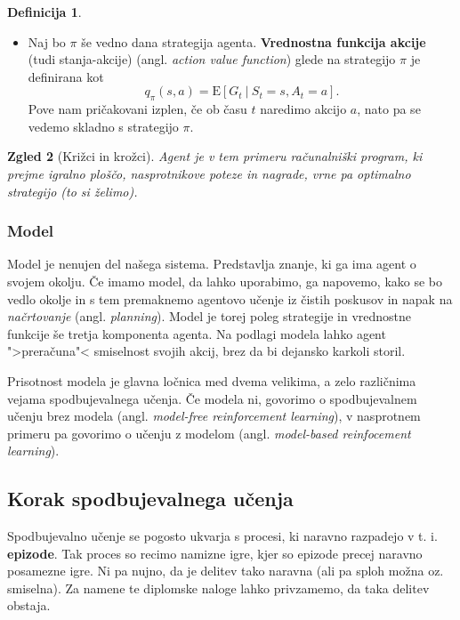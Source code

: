 \documentclass[12pt,a4paper]{amsart}
\theoremstyle{definition} %
\newtheorem{definicija}{Definicija}[section]
\theoremstyle{plain} %
\newtheorem{zgled}[definicija]{Zgled}
\begin{document}
\begin{definicija}
\begin{itemize}
        \item Naj bo $\pi$ še vedno dana strategija agenta. \textbf{Vrednostna funkcija 
                akcije} (tudi stanja-akcije) (angl. \textit{action value function}) glede na 
                strategijo $\pi$ je definirana kot
                $$
                q_\pi(s, a) = \mathrm{E} [G_t~|~S_t = s, A_t = a].
                $$
                Pove nam pričakovani izplen, če ob času $t$ naredimo akcijo $a$, nato pa se 
                vedemo skladno s strategijo $\pi$.
    \end{itemize}
\end{definicija}

\begin{zgled}[Križci in krožci]
    Agent je v tem primeru računalniški program, ki prejme igralno ploščo, nasprotnikove 
    poteze in nagrade, vrne pa optimalno strategijo (to si želimo).
\end{zgled}

\subsubsection{Model}
Model je nenujen del našega sistema. Predstavlja znanje, ki ga ima agent o svojem okolju. 
Če imamo model, da lahko uporabimo, ga napovemo, kako se bo vedlo okolje in s tem premaknemo
agentovo učenje iz čistih poskusov in napak na \textit{načrtovanje} (angl. \textit{planning}).
Model je torej poleg strategije in vrednostne funkcije še tretja komponenta agenta. Na podlagi 
modela lahko agent ">preračuna"< smiselnost svojih akcij, brez da bi dejansko karkoli storil. 

Prisotnost modela je glavna ločnica med dvema velikima, a zelo različnima vejama spodbujevalnega
učenja. Če modela ni, govorimo o spodbujevalnem učenju brez modela (angl. \textit{model-free 
reinforcement learning}), v nasprotnem primeru pa govorimo o učenju z modelom (angl. \textit
{model-based reinfocement learning}).

\subsection{Korak spodbujevalnega učenja}
Spodbujevalno učenje se pogosto ukvarja s procesi, ki naravno razpadejo v t. i. \textbf{epizode}. 
Tak proces so recimo namizne igre, kjer so epizode precej naravno posamezne igre. Ni pa nujno, 
da je delitev tako naravna (ali pa sploh možna oz. smiselna). Za namene te diplomske naloge lahko 
privzamemo, da taka delitev obstaja.
\end{document}
